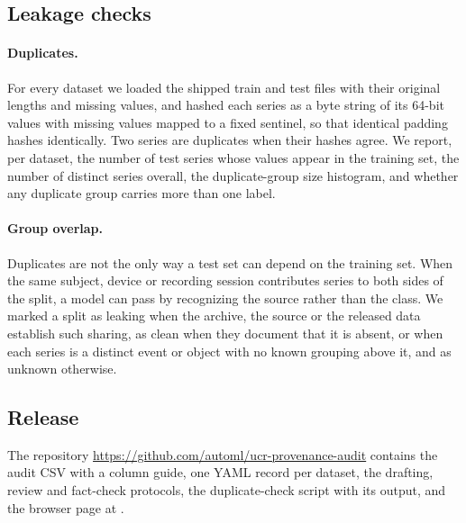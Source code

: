 \subsection{Leakage checks}
\label{app:leakage}

\paragraph{Duplicates.} For every dataset we loaded the shipped train and test files with
their original lengths and missing values, and hashed each series as a byte string of its
64-bit values with missing values mapped to a fixed sentinel, so that identical padding
hashes identically. Two series are duplicates when their hashes agree. We report, per
dataset, the number of test series whose values appear in the training set, the number of
distinct series overall, the duplicate-group size histogram, and whether any duplicate group
carries more than one label. 
\paragraph{Group overlap.} Duplicates are not the only way a test set can depend on the training set.
When the same subject, device or recording session contributes series to both sides of the split, a model can pass by recognizing the source rather than the class. We marked a split as leaking when the archive, the source or the released data establish such sharing, as clean when they document that it is absent, or when each series is a distinct event or object with no known grouping above it, and as unknown otherwise.

\subsection{Release}
\label{app:release}

The repository \url{https://github.com/automl/ucr-provenance-audit} contains the audit CSV with a column guide, one YAML record per dataset, the drafting, review and fact-check protocols, the duplicate-check script with its output, and the browser page at \browserurl. %

\clearpage
